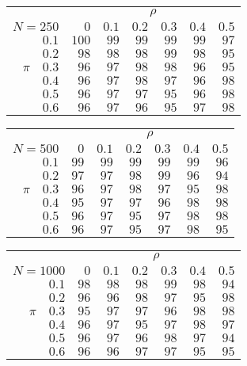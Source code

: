 \begin{tabular}{r|rrrrrr}
\hline\hline
 &\multicolumn{6}{c}{$\rho$} \\ 
 $N = 250$ & $0$ & $0.1$ & $0.2$ & $0.3$ & $0.4$ & $0.5$ \\ 
 \hline$0.1$ & $100$ & $99$ & $99$ & $99$ & $99$ & $97$\\ 
$0.2$ & $98$ & $98$ & $98$ & $99$ & $98$ & $95$\\ 
$\pi\quad$$0.3$ & $96$ & $97$ & $98$ & $98$ & $96$ & $95$\\ 
$0.4$ & $96$ & $97$ & $98$ & $97$ & $96$ & $98$\\ 
$0.5$ & $96$ & $97$ & $97$ & $95$ & $96$ & $98$\\ 
$0.6$ & $96$ & $97$ & $96$ & $95$ & $97$ & $98$\\ 
 \hline 
 \end{tabular}
 
 \vspace{2em} 
 
\begin{tabular}{r|rrrrrr}
\hline\hline
 &\multicolumn{6}{c}{$\rho$} \\ 
 $N = 500$ & $0$ & $0.1$ & $0.2$ & $0.3$ & $0.4$ & $0.5$ \\ 
 \hline$0.1$ & $99$ & $99$ & $99$ & $99$ & $99$ & $96$\\ 
$0.2$ & $97$ & $97$ & $98$ & $99$ & $96$ & $94$\\ 
$\pi\quad$$0.3$ & $96$ & $97$ & $98$ & $97$ & $95$ & $98$\\ 
$0.4$ & $95$ & $97$ & $97$ & $96$ & $98$ & $98$\\ 
$0.5$ & $96$ & $97$ & $95$ & $97$ & $98$ & $98$\\ 
$0.6$ & $96$ & $97$ & $95$ & $97$ & $98$ & $95$\\ 
 \hline 
 \end{tabular}
 
 \vspace{2em} 
 
\begin{tabular}{r|rrrrrr}
\hline\hline
 &\multicolumn{6}{c}{$\rho$} \\ 
 $N = 1000$ & $0$ & $0.1$ & $0.2$ & $0.3$ & $0.4$ & $0.5$ \\ 
 \hline$0.1$ & $98$ & $98$ & $98$ & $99$ & $98$ & $94$\\ 
$0.2$ & $96$ & $96$ & $98$ & $97$ & $95$ & $98$\\ 
$\pi\quad$$0.3$ & $95$ & $97$ & $97$ & $96$ & $98$ & $98$\\ 
$0.4$ & $96$ & $97$ & $95$ & $97$ & $98$ & $97$\\ 
$0.5$ & $96$ & $97$ & $96$ & $98$ & $97$ & $94$\\ 
$0.6$ & $96$ & $96$ & $97$ & $97$ & $95$ & $95$\\ 
 \hline 
 \end{tabular}